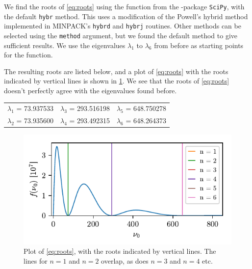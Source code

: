 We find the roots of \cref{eq:roots} using the function  from the \python-package \texttt{SciPy}, with the default \verb!hybr! method. This uses a modification of the Powell's hybrid method\cite{powell1970hybrid} implemented in MINPACK’s \verb!hybrd! and \verb!hybrj! routines. Other methods can be selected using the \verb!method! argument, but we found the default method to give sufficient results. We use the eigenvalues $\lambda_1$ to $\lambda_6$ from before as starting points for the function. 

The resulting roots are listed below, and a plot of \cref{eq:roots} with the roots indicated by vertical lines is shown in \cref{fig:roots}. We see that the roots of \cref{eq:roots} doesn't perfectly agree with the eigenvalues found before.

\begin{center}
\begin{tabular}{ccc}
$\lambda_1$ = 73.937533 &$\lambda_3$ = 293.516198 &$\lambda_5$ = 648.750278 \\
$\lambda_2$ = 73.935600 &$\lambda_4$ = 293.492315 &$\lambda_6$ = 648.264373
\end{tabular}
\end{center}

\begin{figure}[ht!]%
\centering%
\includegraphics{figs/roots_with_roots.pdf}%
\caption{Plot of \cref{eq:roots}, with the roots indicated by vertical lines. The lines for $n=1$ and $n=2$ overlap, as does $n=3$ and $n=4$ etc. \label{fig:roots}}%
\end{figure}

